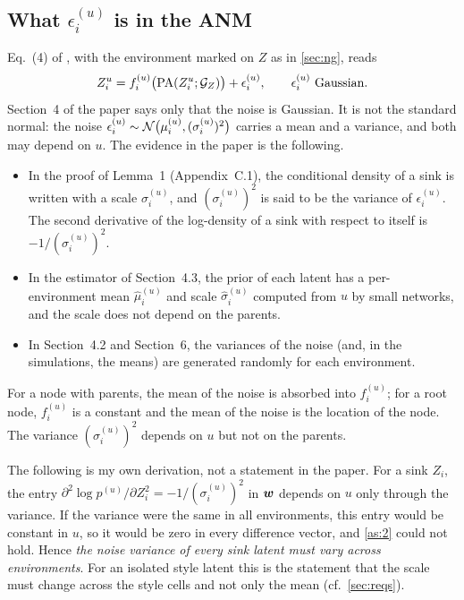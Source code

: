 \subsection{What \texorpdfstring{$\epsilon_i^{(u)}$}{epsilon} is in the ANM}
Eq.~(4) of \cite{ng2025}, with the environment marked on $Z$ as in \cref{sec:ng}, reads
\begin{equation}
Z_i^u=f_i^{(u)}\bigl(\mathrm{PA}(Z_i^u;\mathcal{G}_Z)\bigr)+\epsilon_i^{(u)},\qquad \epsilon_i^{(u)}\ \text{Gaussian}.
\label{eq:anm}
\end{equation}
Section~4 of the paper says only that the noise is Gaussian. It is not the standard normal: the
noise $\epsilon_i^{(u)}\sim\mathcal{N}\bigl(\mu_i^{(u)},(\sigma_i^{(u)})^2\bigr)$ carries a mean and a variance, and both
may depend on $u$. The evidence in the paper is the following.
\begin{itemize}[leftmargin=1.5em]
\item In the proof of Lemma~1 (Appendix~C.1), the conditional density of a sink is written with a scale
      $\sigma_i^{(u)}$, and $(\sigma_i^{(u)})^2$ is said to be the variance of $\epsilon_i^{(u)}$. The second
      derivative of the log-density of a sink with respect to itself is $-1/(\sigma_i^{(u)})^2$.
\item In the estimator of Section~4.3, the prior of each latent has a per-environment mean $\hat\mu_i^{(u)}$
      and scale $\hat\sigma_i^{(u)}$ computed from $u$ by small networks, and the scale does not depend on the
      parents.
\item In Section~4.2 and Section~6, the variances of the noise (and, in the simulations, the means) are
      generated randomly for each environment.
\end{itemize}
For a node with parents, the mean of the noise is absorbed into $f_i^{(u)}$; for a root node, $f_i^{(u)}$ is a
constant and the mean of the noise is the location of the node. The variance $(\sigma_i^{(u)})^2$ depends on $u$
but not on the parents.

The following is my own derivation, not a statement in the paper. For a sink $Z_i$, the entry
$\partial^2\log p^{(u)}/\partial Z_i^2=-1/(\sigma_i^{(u)})^2$ in $\boldsymbol{w}$ depends on $u$ only through the
variance. If the variance were the same in all environments, this entry would be constant in $u$, so it would
be zero in every difference vector, and \cref{as:2} could not hold. Hence \emph{the noise variance of every sink
latent must vary across environments}. For an isolated style latent this is the statement that the scale must
change across the style cells and not only the mean (cf.\ \cref{sec:reqs}).

